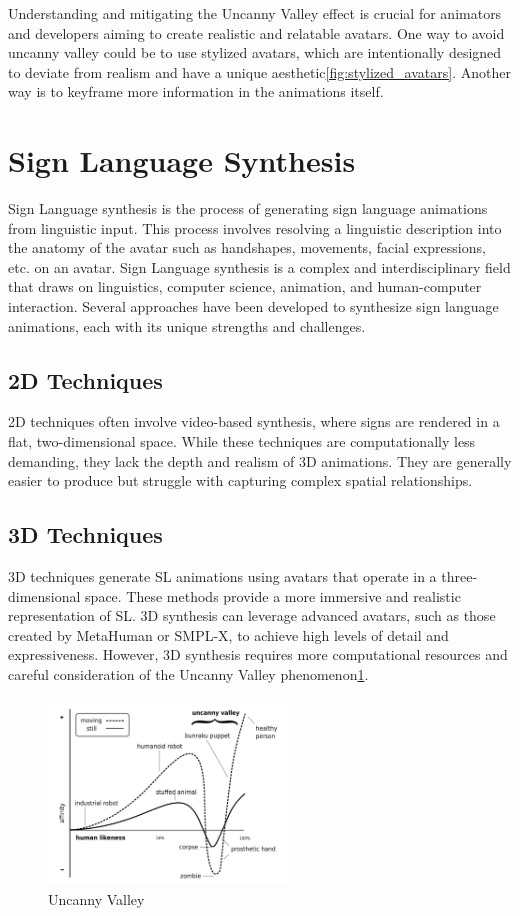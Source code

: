\documentclass[../../main.tex]{subfiles}
\begin{document}
Understanding and mitigating the Uncanny Valley effect is crucial for animators and developers aiming to create realistic and relatable avatars. One way to avoid uncanny valley could be to use stylized avatars, which are intentionally designed to deviate from realism and have a unique aesthetic\ref{fig:stylized_avatars}. Another way is to keyframe more information in the animations itself.

\section{Sign Language Synthesis}

Sign Language synthesis is the process of generating sign language animations from linguistic input. This process involves resolving a linguistic description into the anatomy of the avatar such as handshapes, movements, facial expressions, etc. on an avatar.  Sign Language synthesis is a complex and interdisciplinary field that draws on linguistics, computer science, animation, and human-computer interaction. Several approaches have been developed to synthesize sign language animations, each with its unique strengths and challenges.

\subsection{2D Techniques}

2D techniques often involve video-based synthesis, where signs are rendered in a flat, two-dimensional space. While these techniques are computationally less demanding, they lack the depth and realism of 3D animations. They are generally easier to produce but struggle with capturing complex spatial relationships.

\subsection{3D Techniques}

3D techniques generate SL animations using avatars that operate in a three-dimensional space. These methods provide a more immersive and realistic representation of SL. 3D synthesis can leverage advanced avatars, such as those created by MetaHuman or SMPL-X, to achieve high levels of detail and expressiveness. However, 3D synthesis requires more computational resources and careful consideration of the Uncanny Valley phenomenon\ref{fig:uncanny_valley}.

\begin{figure}
  \centering \includegraphics[width = 2.5in]{chapters/background_work/images/uncanny_valley_graph.png}
  \caption{Uncanny Valley}
  \label{fig:uncanny_valley}
\end{figure}
\end{document}

